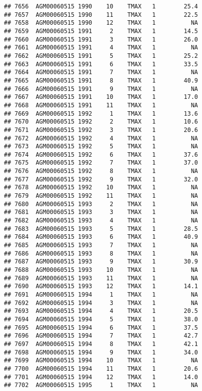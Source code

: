 \documentclass{article}\usepackage[]{graphicx}\usepackage[]{color}
\makeatletter
\newenvironment{kframe}{%
 \def\at@end@of@kframe{}%
 \ifinner\ifhmode%
  \def\at@end@of@kframe{\end{minipage}}%
  \begin{minipage}{\columnwidth}%
 \fi\fi%
 \def\FrameCommand##1{\hskip\@totalleftmargin \hskip-\fboxsep
 \colorbox{shadecolor}{##1}\hskip-\fboxsep
     \hskip-\linewidth \hskip-\@totalleftmargin \hskip\columnwidth}%
 \MakeFramed {\advance\hsize-\width
   \@totalleftmargin\z@ \linewidth\hsize
   \@setminipage}}%
 {\par\unskip\endMakeFramed%
 \at@end@of@kframe}
\newenvironment{knitrout}{}{} %
\makeatother
\begin{document}
\begin{knitrout}
\begin{kframe}
\begin{verbatim}
## 7656  AGM00060515 1990    10    TMAX   1        25.4
## 7657  AGM00060515 1990    11    TMAX   1        22.5
## 7658  AGM00060515 1990    12    TMAX   1          NA
## 7659  AGM00060515 1991     2    TMAX   1        14.5
## 7660  AGM00060515 1991     3    TMAX   1        26.0
## 7661  AGM00060515 1991     4    TMAX   1          NA
## 7662  AGM00060515 1991     5    TMAX   1        25.2
## 7663  AGM00060515 1991     6    TMAX   1        33.5
## 7664  AGM00060515 1991     7    TMAX   1          NA
## 7665  AGM00060515 1991     8    TMAX   1        40.9
## 7666  AGM00060515 1991     9    TMAX   1          NA
## 7667  AGM00060515 1991    10    TMAX   1        17.0
## 7668  AGM00060515 1991    11    TMAX   1          NA
## 7669  AGM00060515 1992     1    TMAX   1        13.6
## 7670  AGM00060515 1992     2    TMAX   1        10.6
## 7671  AGM00060515 1992     3    TMAX   1        20.6
## 7672  AGM00060515 1992     4    TMAX   1          NA
## 7673  AGM00060515 1992     5    TMAX   1          NA
## 7674  AGM00060515 1992     6    TMAX   1        37.6
## 7675  AGM00060515 1992     7    TMAX   1        37.0
## 7676  AGM00060515 1992     8    TMAX   1          NA
## 7677  AGM00060515 1992     9    TMAX   1        32.0
## 7678  AGM00060515 1992    10    TMAX   1          NA
## 7679  AGM00060515 1992    11    TMAX   1          NA
## 7680  AGM00060515 1993     2    TMAX   1          NA
## 7681  AGM00060515 1993     3    TMAX   1          NA
## 7682  AGM00060515 1993     4    TMAX   1          NA
## 7683  AGM00060515 1993     5    TMAX   1        28.5
## 7684  AGM00060515 1993     6    TMAX   1        40.9
## 7685  AGM00060515 1993     7    TMAX   1          NA
## 7686  AGM00060515 1993     8    TMAX   1          NA
## 7687  AGM00060515 1993     9    TMAX   1        30.9
## 7688  AGM00060515 1993    10    TMAX   1          NA
## 7689  AGM00060515 1993    11    TMAX   1          NA
## 7690  AGM00060515 1993    12    TMAX   1        14.1
## 7691  AGM00060515 1994     1    TMAX   1          NA
## 7692  AGM00060515 1994     3    TMAX   1          NA
## 7693  AGM00060515 1994     4    TMAX   1        20.5
## 7694  AGM00060515 1994     5    TMAX   1        38.0
## 7695  AGM00060515 1994     6    TMAX   1        37.5
## 7696  AGM00060515 1994     7    TMAX   1        42.7
## 7697  AGM00060515 1994     8    TMAX   1        42.1
## 7698  AGM00060515 1994     9    TMAX   1        34.0
## 7699  AGM00060515 1994    10    TMAX   1          NA
## 7700  AGM00060515 1994    11    TMAX   1        20.6
## 7701  AGM00060515 1994    12    TMAX   1        14.0
## 7702  AGM00060515 1995     1    TMAX   1          NA

\end{verbatim}
\end{kframe}
\end{knitrout}
\end{document}
